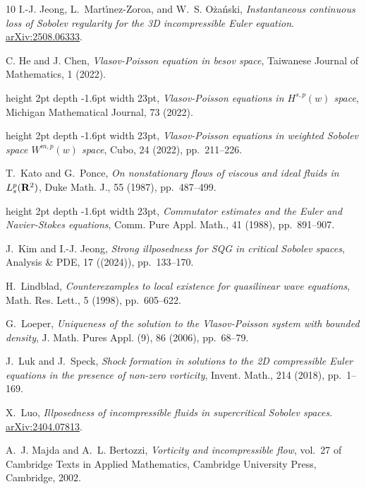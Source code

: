 \documentclass[11pt]{amsart}
\theoremstyle{definition}
\theoremstyle{remark}
\numberwithin{equation}{section}
\newcommand{\0}{\emptyset}
\begin{document}
\begin{thebibliography}{10}
		{\sc I.-J. Jeong, L.~Mart\'{\i}nez-Zoroa, and W.~S. O\.{z}a\'{n}ski}, {\em
			Instantaneous continuous loss of {S}obolev regularity for the 3{D}
			incompressible {E}uler equation}.
		\newblock \href{https://arxiv.org/abs/2508.06333}{arXiv:2508.06333}.
		
		{\sc C. He and J. Chen}, {\em {V}lasov-{P}oisson equation in besov space},
		Taiwanese Journal of Mathematics, 1 (2022).
		
		\leavevmode\vrule height 2pt depth -1.6pt width 23pt, {\em {V}lasov-{P}oisson
			equations in {${H}^{s, p}(w)$} space}, Michigan Mathematical Journal, 73
		(2022).
		
		\leavevmode\vrule height 2pt depth -1.6pt width 23pt, {\em {V}lasov-{P}oisson
			equations in weighted {S}obolev space {${W}^{m, p}(w)$} space}, Cubo, 24
		(2022), pp.~211--226.
		
		{\sc T.~Kato and G.~Ponce}, {\em On nonstationary flows of viscous and ideal
			fluids in {$L^p_s({\bf R}^2)$}}, Duke Math. J., 55 (1987), pp.~487--499.
		
		\leavevmode\vrule height 2pt depth -1.6pt width 23pt, {\em Commutator estimates
			and the {E}uler and {N}avier-{S}tokes equations}, Comm. Pure Appl. Math., 41
		(1988), pp.~891--907.
		
		{\sc J.~Kim and I.-J. Jeong}, {\em Strong illposedness for {S}{Q}{G} in
			critical {S}obolev spaces}, Analysis \& PDE, 17 ((2024)), pp.~133--170.
		
		{\sc H.~Lindblad}, {\em Counterexamples to local existence for quasilinear wave
			equations}, Math. Res. Lett., 5 (1998), pp.~605--622.
		
		{\sc G.~Loeper}, {\em Uniqueness of the solution to the {V}lasov-{P}oisson
			system with bounded density}, J. Math. Pures Appl. (9), 86 (2006),
		pp.~68--79.
		
		{\sc J.~Luk and J.~Speck}, {\em Shock formation in solutions to the 2{D}
			compressible {E}uler equations in the presence of non-zero vorticity},
		Invent. Math., 214 (2018), pp.~1--169.
		
		{\sc X.~Luo}, {\em Illposedness of incompressible fluids in supercritical
			{S}obolev spaces}.
		\newblock \href{https://arxiv.org/abs/2404.07813}{arXiv:2404.07813}.
		
		{\sc A.~J. Majda and A.~L. Bertozzi}, {\em Vorticity and incompressible flow},
		vol.~27 of Cambridge Texts in Applied Mathematics, Cambridge University
		Press, Cambridge, 2002.
		

\end{thebibliography}
\end{document}
